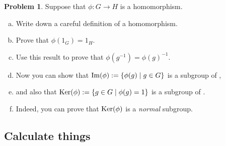 \documentclass[12pt]{article}
\theoremstyle{definition} %
\newtheorem{problem}{Problem}
\newcommand\inv{^{-1}} %
\begin{document}
\begin{problem}
    Suppose that $\phi:G\to H$ is a homomorphism.
    \begin{enumerate}[(a)]
        \item Write down a careful definition of a homomorphism.
        \item Prove that $\phi(1_G) = 1_H$.
        \item Use this result to prove that $\phi(g\inv) = \phi(g)\inv$.
        \item Now you can show that $\operatorname{Im}(\phi) := \{\phi(g) \mid g\in G\}$ is a subgroup of \underline{\quad},
        \item and also that $\operatorname{Ker}(\phi) := \{g \in G \mid \phi(g) = 1\}$ is a subgroup of \underline{\quad}.
        \item Indeed, you can prove that $\operatorname{Ker}(\phi)$ is a \textit{normal} subgroup.
    \end{enumerate}
\end{problem}

\subsection*{Calculate things}
\end{document}

